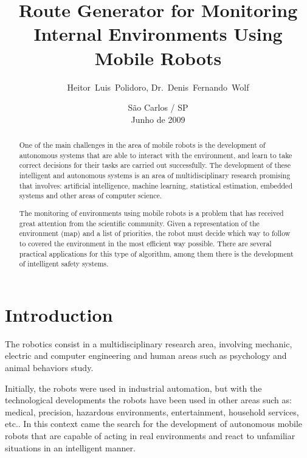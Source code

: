 \documentclass[9pt,journal]{IEEEtran}
\begin{document}
	\title{Route Generator for Monitoring Internal Environments Using Mobile Robots}
	\author{Heitor~Luis~Polidoro, Dr.~Denis~Fernando~Wolf}
	\date{São Carlos / SP\\Junho de 2009}
	\maketitle

	\begin{abstract}
One of the main challenges in the area of mobile robots is the development of autonomous systems that are able to interact with the environment, and learn to take correct decisions for their tasks are carried out successfully. The development of these intelligent and autonomous systems is an area of multidisciplinary research promising that involves: artificial intelligence, machine learning, statistical estimation, embedded systems and other areas of computer science.
	
The monitoring of environments using mobile robots is a problem that has received great attention from the scientific community. Given a representation of the environment (map) and a list of priorities, the robot must decide which way to follow to covered the environment in the most efficient way possible. There are several practical applications for this type of algorithm, among them there is the development of intelligent safety systems.
	\end{abstract}

	\section{Introduction}

The robotics consist in a multidisciplinary research area, involving mechanic, electric and computer engineering and human areas such as psychology and animal behaviors study.

Initially, the robots were used in industrial automation, but with the technological developments the robots have been used in other areas such as: medical, precision, hazardous environments, entertainment, household services, etc.. In this context came the search for the development of autonomous mobile robots that are capable of acting in real environments and react to unfamiliar situations in an intelligent manner.
\end{document}
